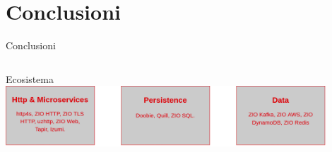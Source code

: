 \section{Conclusioni}
\begin{frame}{Conclusioni}

  \begin{columns}
    \begin{column}{.86\textwidth}
      \begin{block}{\centering Ecosistema}
        \vspace{2mm}
        \centering
      \includegraphics[width=0.9\textwidth]{img/zio-ecosystem.png}
      \label{ecosystem.}
      \end{block}
    \end{column}
  \end{columns}


\end{frame}
